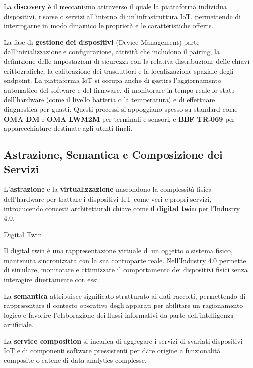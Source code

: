 \documentclass[
  italian,
  openany]{book}
\begin{document}
La \textbf{discovery} è il meccanismo attraverso il quale la piattaforma
individua dispositivi, risorse o servizi all'interno di
un'infrastruttura IoT, permettendo di interrogarne in modo dinamico le
proprietà e le caratteristiche offerte.

La fase di \textbf{gestione dei dispositivi} (Device Management) parte
dall'inizializzazione e configurazione, attività che includono il
pairing, la definizione delle impostazioni di sicurezza con la relativa
distribuzione delle chiavi crittografiche, la calibrazione dei
trasduttori e la localizzazione spaziale degli endpoint. La piattaforma
IoT si occupa anche di gestire l'aggiornamento automatico del software e
del firmware, di monitorare in tempo reale lo stato dell'hardware (come
il livello batteria o la temperatura) e di effettuare diagnostica per
guasti. Questi processi si appoggiano spesso su standard come
\textbf{OMA DM} e \textbf{OMA LWM2M} per terminali e sensori, e
\textbf{BBF TR-069} per apparecchiature destinate agli utenti finali.

\subsection{Astrazione, Semantica e Composizione dei
Servizi}\label{astrazione-semantica-e-composizione-dei-servizi}

L'\textbf{astrazione} e la \textbf{virtualizzazione} nascondono la
complessità fisica dell'hardware per trattare i dispositivi IoT come
veri e propri servizi, introducendo concetti architetturali chiave come
il \textbf{digital twin} per l'Industry 4.0.

\begin{calloutdefinition}{Digital Twin}

Il digital twin è una rappresentazione virtuale di un oggetto o sistema
fisico, mantenuta sincronizzata con la sua controparte reale.
Nell'Industry 4.0 permette di simulare, monitorare e ottimizzare il
comportamento dei dispositivi fisici senza interagire direttamente con
essi.

\end{calloutdefinition}

La \textbf{semantica} attribuisce significato strutturato ai dati
raccolti, permettendo di rappresentare il contesto operativo degli
apparati per abilitare un ragionamento logico e favorire l'elaborazione
dei flussi informativi da parte dell'intelligenza artificiale.

La \textbf{service composition} si incarica di aggregare i servizi di
svariati dispositivi IoT e di componenti software preesistenti per dare
origine a funzionalità composite o catene di data analytics complesse.
\end{document}
